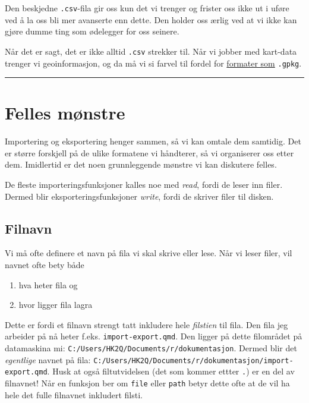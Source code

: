 \documentclass[
  letterpaper,
  DIV=11,
  numbers=noendperiod]{scrreprt}
\providecommand{\tightlist}{%
  \setlength{\itemsep}{0pt}\setlength{\parskip}{0pt}}\usepackage{longtable,booktabs,array}
\begin{document}
Den beskjedne \texttt{.csv}-fila gir oss kun det vi trenger og frister
oss ikke ut i uføre ved å la oss bli mer avanserte enn dette. Den holder
oss ærlig ved at vi ikke kan gjøre dumme ting som ødelegger for oss
seinere.

Når det er sagt, det er ikke alltid \texttt{.csv} strekker til. Når vi
jobber med kart-data trenger vi geoinformasjon, og da må vi si farvel
til fordel for
\href{https://r.geocompx.org/read-write.html\#data-output}{formater som}
\texttt{.gpkg}.

\begin{center}\rule{0.5\linewidth}{0.5pt}\end{center}

\hypertarget{felles-muxf8nstre}{%
\section{Felles mønstre}\label{felles-muxf8nstre}}

Importering og eksportering henger sammen, så vi kan omtale dem
samtidig. Det er større forskjell på de ulike formatene vi håndterer, så
vi organiserer oss etter dem. Imidlertid er det noen grunnleggende
mønstre vi kan diskutere felles.

De fleste importeringsfunksjoner kalles noe med \emph{read}, fordi de
leser inn filer. Dermed blir eksporteringsfunksjoner \emph{write}, fordi
de skriver filer til disken.

\hypertarget{filnavn}{%
\subsection{Filnavn}\label{filnavn}}

Vi må ofte definere et navn på fila vi skal skrive eller lese. Når vi
leser filer, vil navnet ofte bety både

\begin{enumerate}
\def\labelenumi{\arabic{enumi}.}
\tightlist
\item
  hva heter fila og
\item
  hvor ligger fila lagra
\end{enumerate}

Dette er fordi et filnavn strengt tatt inkludere hele \emph{filstien}
til fila. Den fila jeg arbeider på nå heter f.eks.
\texttt{import-export.qmd}. Den ligger på dette filområdet på
datamaskina mi: \texttt{C:/Users/HK2Q/Documents/r/dokumentasjon}. Dermed
blir det \emph{egentlige} navnet på fila:
\texttt{C:/Users/HK2Q/Documents/r/dokumentasjon/import-export.qmd}. Husk
at også filtutvidelsen (det som kommer ettter \texttt{.}) er en del av
filnavnet! Når en funksjon ber om \texttt{file} eller \texttt{path}
betyr dette ofte at de vil ha hele det fulle filnavnet inkludert filsti.
\end{document}
